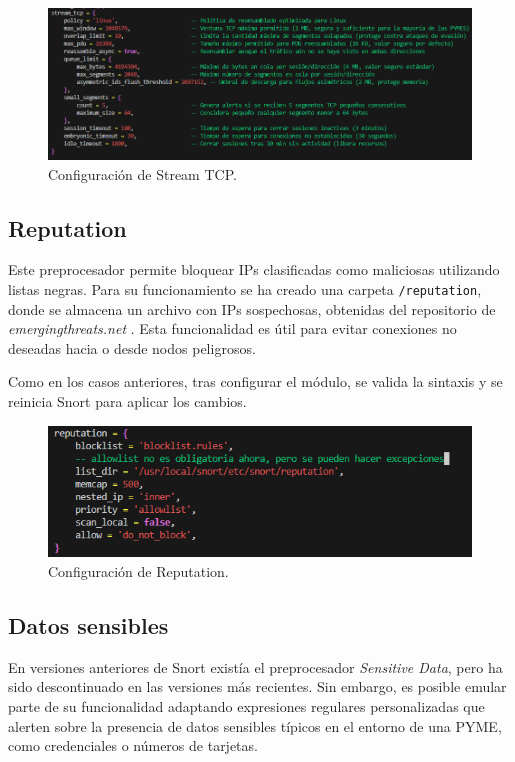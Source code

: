 \documentclass[12pt,a4paper]{report}
\begin{document}
\begin{figure}[H]
	\centering
	\includegraphics[scale=0.6]{stream_tcp/1.png}
	\caption{Configuración de Stream TCP.}
\end{figure}

\subsection{Reputation}

Este preprocesador permite bloquear IPs clasificadas como maliciosas utilizando listas negras. Para su funcionamiento se ha creado una carpeta \texttt{/reputation}, donde se almacena un archivo con IPs sospechosas, obtenidas del repositorio de \textit{emergingthreats.net} \cite{emerging_block_ips}. Esta funcionalidad es útil para evitar conexiones no deseadas hacia o desde nodos peligrosos.\newline

Como en los casos anteriores, tras configurar el módulo, se valida la sintaxis y se reinicia Snort para aplicar los cambios.

\begin{figure}[H]
	\centering
	\includegraphics[scale=0.8]{reputation/1.png}
	\caption{Configuración de Reputation.}
\end{figure}

\newpage

\subsection{Datos sensibles}

En versiones anteriores de Snort existía el preprocesador \textit{Sensitive Data}, pero ha sido descontinuado en las versiones más recientes. Sin embargo, es posible emular parte de su funcionalidad adaptando expresiones regulares personalizadas que alerten sobre la presencia de datos sensibles típicos en el entorno de una PYME, como credenciales o números de tarjetas.\newline
\end{document}
